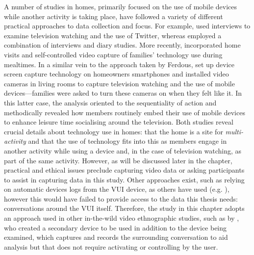 \begin{revisedsubmission}
\label{line:prevhomestudy}A number of studies in homes, primarily focused on the use of mobile devices while another activity is taking place, have followed a variety of different practical approaches to data collection and focus.
For example, \citet{Schirra2014} used interviews to examine television watching and the use of Twitter, whereas \citet{Jokela2015b} employed a combination of interviews and diary studies.
More recently, \citet{Ferdous2016} incorporated home visits and self-controlled video capture of families' technology use during mealtimes.
In a similar vein to the approach taken by Ferdous, \citet{Rooksby2015} set up device screen capture technology on homeowners smartphones and installed video cameras in living rooms to capture television watching and the use of mobile devices---families were asked to turn these cameras on when they felt like it.
In this latter case, the analysis oriented to the sequentiality of action and methodically revealed how members routinely embed their use of mobile devices to enhance leisure time socialising around the television.
Both studies reveal crucial details about technology use in homes: that the home is a site for \textit{multi-activity} and that the use of technology fits into this as members engage in another activity while using a device and, in the case of television watching, as part of the same activity.
However, as will be discussed later in the chapter, practical and ethical issues preclude capturing video data or asking participants to assist in capturing data in this study.
Other approaches exist, such as relying on automatic devices logs from the \ac{VUI} device, as others have used (e.g. \citet{Ammari2019}), however this would have failed to provide access to the data this thesis needs: conversations around the \ac{VUI} itself.
Therefore, the study in this chapter adopts an approach used in other in-the-wild video ethnographic studies, such as by \citet{Pizza2016}, who created a secondary device to be used in addition to the device being examined, which captures and records the surrounding conversation to aid analysis but that does not require activating or controlling by the user.
\end{revisedsubmission}

